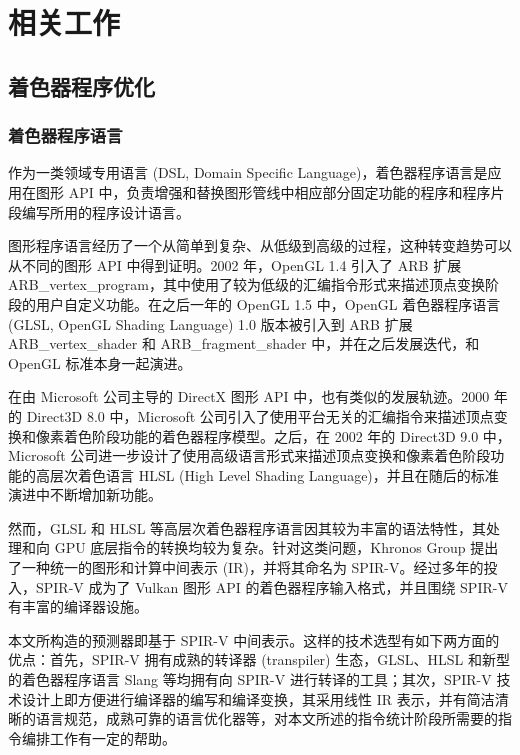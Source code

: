 
\chapter{相关工作}

\section{着色器程序优化}

\subsection{着色器程序语言}

作为一类领域专用语言 (DSL, Domain Specific Language)，着色器程序语言是应用在图形 API 中，负责增强和替换图形管线中相应部分固定功能的程序和程序片段编写所用的程序设计语言。


图形程序语言经历了一个从简单到复杂、从低级到高级的过程，这种转变趋势可以从不同的图形 API 中得到证明。2002 年，OpenGL 1.4 引入了 ARB 扩展 ARB\_vertex\_program，其中使用了较为低级的汇编指令形式来描述顶点变换阶段的用户自定义功能。在之后一年的 OpenGL 1.5 中，OpenGL 着色器程序语言 (GLSL, OpenGL Shading Language) 1.0 版本被引入到 ARB 扩展 ARB\_vertex\_shader 和 ARB\_fragment\_shader 中，并在之后发展迭代，和 OpenGL 标准本身一起演进。

在由 Microsoft 公司主导的 DirectX 图形 API 中，也有类似的发展轨迹。2000 年的 Direct3D 8.0 中，Microsoft 公司引入了使用平台无关的汇编指令来描述顶点变换和像素着色阶段功能的着色器程序模型。之后，在 2002 年的 Direct3D 9.0 中，Microsoft 公司进一步设计了使用高级语言形式来描述顶点变换和像素着色阶段功能的高层次着色语言 HLSL (High Level Shading Language)，并且在随后的标准演进中不断增加新功能。

然而，GLSL 和 HLSL 等高层次着色器程序语言因其较为丰富的语法特性，其处理和向 GPU 底层指令的转换均较为复杂。针对这类问题，Khronos Group 提出了一种统一的图形和计算中间表示 (IR)，并将其命名为 SPIR-V。经过多年的投入，SPIR-V 成为了 Vulkan 图形 API 的着色器程序输入格式，并且围绕 SPIR-V 有丰富的编译器设施。

本文所构造的预测器即基于 SPIR-V 中间表示。这样的技术选型有如下两方面的优点：首先，SPIR-V 拥有成熟的转译器 (transpiler) 生态，GLSL、HLSL 和新型的着色器程序语言 Slang 等均拥有向 SPIR-V 进行转译的工具；其次，SPIR-V 技术设计上即方便进行编译器的编写和编译变换，其采用线性 IR 表示，并有简洁清晰的语言规范，成熟可靠的语言优化器等，对本文所述的指令统计阶段所需要的指令编排工作有一定的帮助。

